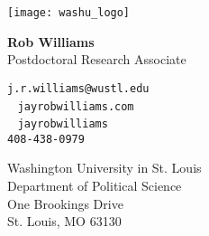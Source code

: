 \documentclass[10pt]{article}
\begin{document}
	

\texttt{[image: washu\_logo]}%
\hspace{0mm}
\parbox{2in}{
	\vspace{-18mm}
    \textbf{Rob Williams} \\
    Postdoctoral Research Associate
}

\vspace{-4mm}
\hspace{12mm}
\parbox{2in}{
	
	\faEnvelopeO \hspace{.65mm} \texttt{j.r.williams@wustl.edu} \\
	\faGlobe ~ \texttt{jayrobwilliams.com} \\
	\faGithub ~ \texttt{jayrobwilliams} \\
	\faPhone \hspace{1.30mm} \texttt{408-438-0979}
}

\vspace{3mm}
\hspace{12mm}
\parbox{2.5in}{
	\small
	\textsf{\textcolor{uncblue}{Washington University in St. Louis}}\\
	\scriptsize Department of Political Science \\
	One Brookings Drive \\
	St. Louis, MO 63130
}
\end{document}
